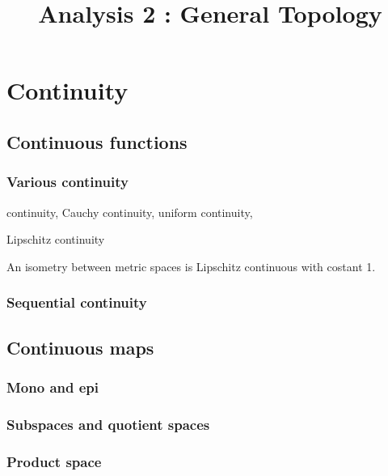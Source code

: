 \documentclass{../crs}
\title{Analysis 2 : General Topology}
\begin{document}
\maketitle
\tableofcontents

\frontmatter


\mainmatter







\chapter{Continuity}

\section{Continuous functions}

\subsection{Various continuity}
continuity, Cauchy continuity, uniform continuity, 

Lipschitz continuity
\begin{ex}
An isometry between metric spaces is Lipschitz continuous with costant 1.
\end{ex}

\subsection{Sequential continuity}




\section{Continuous maps}

\subsection{Mono and epi}

\subsection{Subspaces and quotient spaces}

\subsection{Product space}
\end{document}

